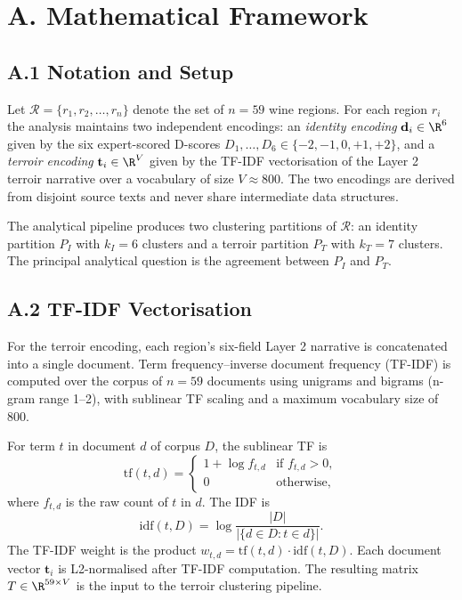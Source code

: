 \documentclass[11pt]{article}
\begin{document}

\section*{A. Mathematical Framework}

\subsection*{A.1 Notation and Setup}
Let $\mathcal{R} = \{r_1, r_2, \ldots, r_n\}$ denote the set of $n = 59$ wine regions. For each region $r_i$ the analysis maintains two independent encodings: an \emph{identity encoding} $\mathbf{d}_i \in \R^{6}$ given by the six expert-scored D-scores $D_1, \ldots, D_6 \in \{-2, -1, 0, +1, +2\}$, and a \emph{terroir encoding} $\mathbf{t}_i \in \R^{V}$ given by the TF-IDF vectorisation of the Layer 2 terroir narrative over a vocabulary of size $V \approx 800$. The two encodings are derived from disjoint source texts and never share intermediate data structures.

The analytical pipeline produces two clustering partitions of $\mathcal{R}$: an identity partition $P_I$ with $k_I = 6$ clusters and a terroir partition $P_T$ with $k_T = 7$ clusters. The principal analytical question is the agreement between $P_I$ and $P_T$.

\subsection*{A.2 TF-IDF Vectorisation}
For the terroir encoding, each region's six-field Layer 2 narrative is concatenated into a single document. Term frequency--inverse document frequency (TF-IDF) is computed over the corpus of $n = 59$ documents using unigrams and bigrams (n-gram range 1--2), with sublinear TF scaling and a maximum vocabulary size of 800.

For term $t$ in document $d$ of corpus $D$, the sublinear TF is
\[
\mathrm{tf}(t, d) = \begin{cases} 1 + \log f_{t,d} & \text{if } f_{t,d} > 0, \\ 0 & \text{otherwise}, \end{cases}
\]
where $f_{t,d}$ is the raw count of $t$ in $d$. The IDF is
\[
\mathrm{idf}(t, D) = \log \frac{|D|}{|\{d \in D : t \in d\}|}.
\]
The TF-IDF weight is the product $w_{t,d} = \mathrm{tf}(t, d) \cdot \mathrm{idf}(t, D)$. Each document vector $\mathbf{t}_i$ is L2-normalised after TF-IDF computation. The resulting matrix $T \in \R^{59 \times V}$ is the input to the terroir clustering pipeline.
\end{document}
